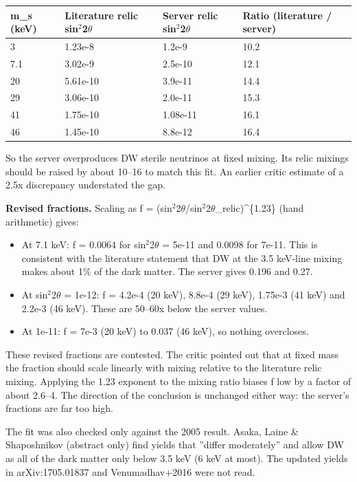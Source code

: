 \documentclass[11pt,a4paper]{article}
\begin{document}
\begin{longtable}{@{}p{}p{}p{}p{}@{}}
\toprule
\textbf{m\_s (keV)} & \textbf{Literature relic sin$^2$2$\theta$} & \textbf{Server relic sin$^2$2$\theta$} & \textbf{Ratio (literature / server)} \\ \midrule \endhead
3 & 1.23e-8 & 1.2e-9 & 10.2 \\
7.1 & 3.02e-9 & 2.5e-10 & 12.1 \\
20 & 5.61e-10 & 3.9e-11 & 14.4 \\
29 & 3.06e-10 & 2.0e-11 & 15.3 \\
41 & 1.75e-10 & 1.08e-11 & 16.1 \\
46 & 1.45e-10 & 8.8e-12 & 16.4 \\
\bottomrule\end{longtable}
So the server overproduces DW sterile neutrinos at fixed mixing. Its relic mixings should be raised by about 10--16 to match this fit. An earlier critic estimate of a 2.5x discrepancy understated the gap.

\textbf{Revised fractions.} Scaling as f = (sin$^2$2$\theta$/sin$^2$2$\theta$\_relic)\textasciicircum{}\{1.23\} (hand arithmetic) gives:

\begin{itemize}
  \item At 7.1 keV: f = 0.0064 for sin$^2$2$\theta$ = 5e-11 and 0.0098 for 7e-11. This is consistent with the literature statement that DW at the 3.5 keV-line mixing makes about 1\% of the dark matter. The server gives 0.196 and 0.27.
  \item At sin$^2$2$\theta$ = 1e-12: f = 4.2e-4 (20 keV), 8.8e-4 (29 keV), 1.75e-3 (41 keV) and 2.2e-3 (46 keV). These are 50--60x below the server values.
  \item At 1e-11: f = 7e-3 (20 keV) to 0.037 (46 keV), so nothing overcloses.
\end{itemize}
These revised fractions are contested. The critic pointed out that at fixed mass the fraction should scale linearly with mixing relative to the literature relic mixing. Applying the 1.23 exponent to the mixing ratio biases f low by a factor of about 2.6--4. The direction of the conclusion is unchanged either way: the server's fractions are far too high.

The fit was also checked only against the 2005 result. Asaka, Laine \& Shaposhnikov (abstract only) find yields that ''differ moderately'' and allow DW as all of the dark matter only below 3.5 keV (6 keV at most). The updated yields in arXiv:1705.01837 and Venumadhav+2016 were not read.
\end{document}

